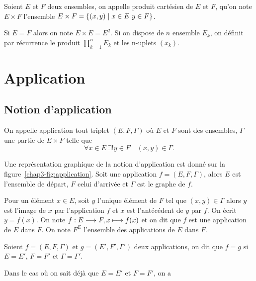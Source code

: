\begin{defdef}
    Soient \(E\) et \(F\) deux ensembles, on appelle produit cartésien de \(E\) et 
    \(F\), qu'on note \(E \times F\) l'ensemble $E \times F = \left\{(x,y)\mathrel{}\middle|\mathrel{}x \in E 
    \ y \in F\right\}$.
\end{defdef}

Si \(E=F\) alors on note \(E \times E=E^2\). Si on dispose de \(n\) ensemble 
\(E_k\), on définit par récurrence le produit \(\prod_{k=1}^n E_k\) et les 
n-uplets \((x_k)\).

\section{Application}
\label{chap3-sec:applications}

\subsection{Notion d'application}
\label{chap3-subsec:notiondapplication}

\begin{defdef}
    On appelle application tout triplet \((E, F, \Gamma)\) où \(E\) et \(F\) sont 
    des ensembles, \(\Gamma\) une partie de \(E \times F\) telle que
    \begin{equation}
        \forall x \in E \ \exists! y \in F \quad (x,y) \in \Gamma.
    \end{equation}
\end{defdef}

Une représentation graphique de la notion d'application est donné sur la 
figure~\ref{chap3-fig:application}. Soit une application \(f=(E,F,\Gamma)\), 
alors \(E\) est l'ensemble de départ, \(F\) celui d'arrivée et \(\Gamma\) est le 
graphe de \(f\).

Pour un élément \(x \in E\), soit \(y\) l'unique élément de \(F\) tel que 
\((x,y) \in \Gamma\) alors \(y\) est l'image de \(x\) par l'application \(f\) et 
\(x\) est l'antécédent de \(y\) par \(f\). On écrit \(y=f(x)\). On note 
\(f:E \longrightarrow F, x \longmapsto f(x)\) et on dit que \(f\) est une application de 
\(E\) dans \(F\). On note \(F^E\) l'ensemble des applications de \(E\) dans 
\(F\).

\begin{defdef}
    Soient \(f=(E,F,\Gamma)\) et \(g=(E',F',\Gamma')\) deux applications, on dit que 
    \(f=g\) si \(E=E'\), \(F=F'\) et \(\Gamma=\Gamma'\).
\end{defdef}

Dans le cas où on sait déjà que \(E=E'\) et \(F=F'\), on a

